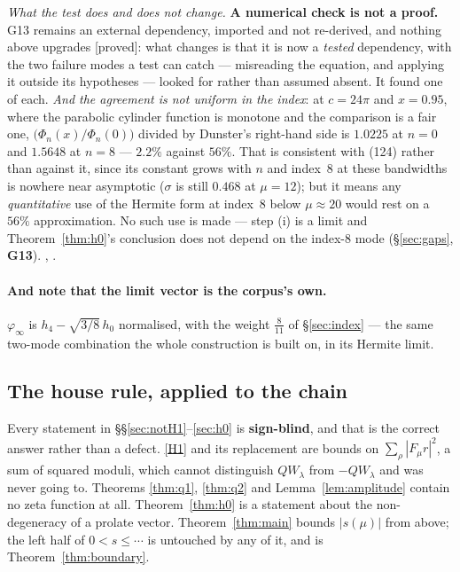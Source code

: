 \documentclass[11pt,a4paper]{article}
\theoremstyle{plain}
\theoremstyle{definition}
\theoremstyle{remark}
\newcommand{\st}[1]{{\normalfont\sffamily\footnotesize[#1]}}
\newcommand{\proved}{\st{proved}}
\newcommand{\R}{\mathbb{R}}
\newcommand{\Z}{\mathbb{Z}}
\newcommand{\Q}{\mathbb{Q}}
\newcommand{\A}{\mathbb{A}}
\newcommand{\E}{\mathcal{E}}
\newcommand{\F}{\mathcal{F}}
\newcommand{\QW}{QW}
\newcommand{\file}[1]{\path{#1}}
\def\QW{QW}\def\E{E}\def\F{F}\def\R{R}\def\Q{Q}\def\Z{Z}\def\A{A}%
\begin{document}
\emph{What the test does and does not change.}  \textbf{A numerical check is not
a proof.}  G13 remains an external dependency, imported and not re-derived, and
nothing above upgrades \proved{}: what changes is that it is now a
\emph{tested} dependency, with the two failure modes a test can catch ---
misreading the equation, and applying it outside its hypotheses --- looked for
rather than assumed absent.  It found one of each.  \emph{And the agreement is
not uniform in the index}: at $c=24\pi$ and $x=0.95$, where the parabolic
cylinder function is monotone and the comparison is a fair one,
$\big(\Phi_n(x)/\Phi_n(0)\big)$ divided by Dunster's right-hand side is
$1.0225$ at $n=0$ and $1.5648$ at $n=8$ --- $2.2\%$ against $56\%$.  That is
consistent with (124) rather than against it, since its constant grows with $n$
and index~$8$ at these bandwidths is nowhere near asymptotic ($\sigma$ is still
$0.468$ at $\mu=12$); but it means any \emph{quantitative} use of the Hermite
form at index~$8$ below $\mu\approx20$ would rest on a $56\%$ approximation.
No such use is made --- step (i) is a limit and
Theorem~\ref{thm:h0}'s conclusion does not depend on the index-8 mode
(\S\ref{sec:gaps}, \textbf{G13}).  \file{verify_dunster.py}, \file{dunster-check.md}.

\paragraph{And note that the limit vector is the corpus's own.}
$\varphi_\infty$ is $h_4-\sqrt{3/8}\,h_0$ normalised, with the weight
$\tfrac8{11}$ of \S\ref{sec:index} --- the same two-mode combination the whole
construction is built on, in its Hermite limit.

\subsection{The house rule, applied to the chain}
\label{sec:chainsignblind}

Every statement in \S\S\ref{sec:notH1}--\ref{sec:h0} is \textbf{sign-blind}, and
that is the correct answer rather than a defect.  \eqref{H1} and its replacement
are bounds on $\sum_\rho|\F_\mu r|^2$, a sum of squared moduli, which cannot
distinguish $\QW_\lambda$ from $-\QW_\lambda$ and was never going to.
Theorems \ref{thm:q1}, \ref{thm:q2} and Lemma~\ref{lem:amplitude} contain no
zeta function at all.  Theorem~\ref{thm:h0} is a statement about the
non-degeneracy of a prolate vector.  Theorem~\ref{thm:main} bounds $|s(\mu)|$
from above; the left half of $0<s\le\cdots$ is untouched by any of it, and is
Theorem~\ref{thm:boundary}.
\end{document}
